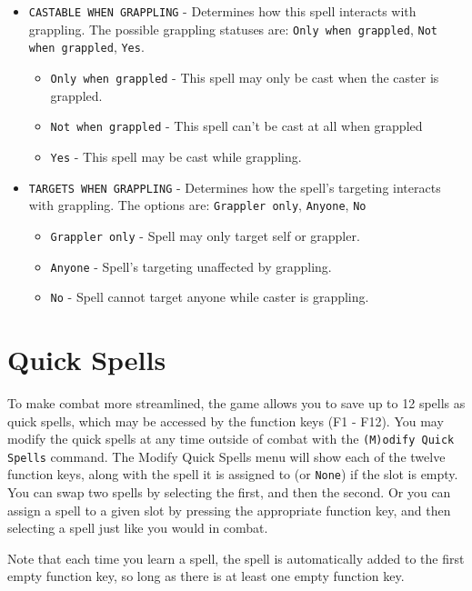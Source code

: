 \documentclass{report}
\begin{document}
\begin{itemize}
    \item \verb|CASTABLE WHEN GRAPPLING| - Determines how this spell interacts with
    grappling. The possible grappling statuses are: \verb|Only when grappled|, 
    \verb|Not when grappled|, \verb|Yes|. 
        \begin{itemize}
            \item \verb|Only when grappled| - This spell may only be cast when
            the caster is grappled.
            \item \verb|Not when grappled| - This spell can't be cast at all
            when grappled
            \item \verb|Yes| - This spell may be cast while grappling.
        \end{itemize}
    \item \verb|TARGETS WHEN GRAPPLING| - Determines how the spell's targeting
    interacts with grappling. The options are: \verb|Grappler only|, \verb|Anyone|,
    \verb|No|
    \begin{itemize}
        \item \verb|Grappler only| - Spell may only target self or grappler.
        \item \verb|Anyone| - Spell's targeting unaffected by grappling.
        \item \verb|No| - Spell cannot target anyone while caster is grappling.
    \end{itemize}
\end{itemize}

\section{Quick Spells}

To make combat more streamlined, the game allows you to save up to 12 spells as quick spells, which may be accessed by the function keys (F1 - F12). You may modify the quick spells at any time 
outside of combat with the \verb|(M)odify Quick Spells| command. The Modify Quick Spells menu will show each of the twelve function keys, along with the spell it is assigned to (or \verb|None|) if
the slot is empty. You can swap two spells by selecting the first, and then the second. Or you can assign a spell to a given slot by pressing the appropriate function key, and then selecting a spell
just like you would in combat.

Note that each time you learn a spell, the spell is automatically added to the first empty function key, so long as there is at least one empty function key.
\end{document}
